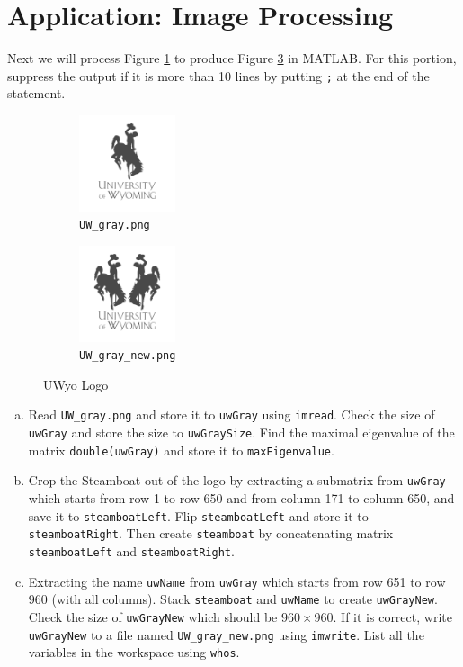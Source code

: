 \section{Application: Image Processing}
Next we will process Figure \ref{fig:a} to produce Figure \ref{fig:b} in MATLAB. For this portion, suppress the output if it is more than 10 lines by putting \verb|;| at the end of the statement.
\begin{figure}[!hbtp]
  \centering
  \begin{subfigure}[b]{0.25\textwidth}
    \centering
    \includegraphics[width=80pt]{../pics/UW_gray.png}
    \caption{\texttt{UW_gray.png}}
    \label{fig:a}
  \end{subfigure}
  \begin{subfigure}[b]{0.25\textwidth}
    \centering
    \includegraphics[width=80pt]{../pics/UW_gray_new.png}
    \caption{\texttt{UW_gray_new.png}}
    \label{fig:b}
  \end{subfigure}
  \caption{UWyo Logo}
\end{figure}

\begin{enumerate}[(a)]
  \item Read \verb|UW_gray.png| and store it to \verb|uwGray| using \verb|imread|. Check the size of \verb|uwGray| and store the size to \verb|uwGraySize|. Find the maximal eigenvalue of the matrix \verb|double(uwGray)| and store it to \verb|maxEigenvalue|.
  \item Crop the Steamboat out of the logo by extracting a submatrix from \verb|uwGray| which starts from row 1 to row 650 and from column 171 to column 650, and save it to \verb|steamboatLeft|. Flip \verb|steamboatLeft| and store it to \verb|steamboatRight|. Then create \verb|steamboat| by concatenating matrix \verb|steamboatLeft| and \verb|steamboatRight|.
  \item Extracting the name \verb|uwName| from \verb|uwGray| which starts from row 651 to row 960 (with all columns). Stack \verb|steamboat| and \verb|uwName| to create \verb|uwGrayNew|. Check the size of \verb|uwGrayNew| which should be $960 \times 960$. If it is correct, write \verb|uwGrayNew| to a file named \verb|UW_gray_new.png| using \verb|imwrite|. List all the variables in the workspace using \verb|whos|.
\end{enumerate}

